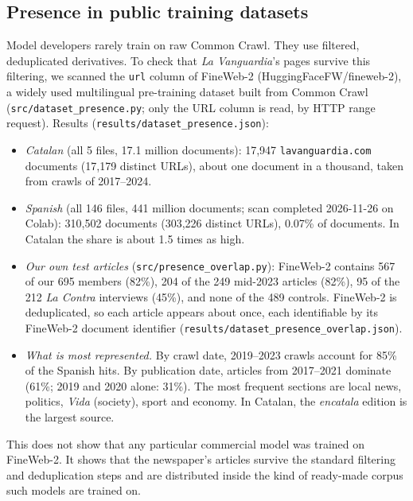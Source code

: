 \documentclass[10pt,a4paper]{article}
\begin{document}
\subsection{Presence in public training datasets}\label{sec:presence}
Model developers rarely train on raw Common Crawl. They use filtered, deduplicated derivatives. To check that
\emph{La Vanguardia}'s pages survive this filtering, we scanned the \texttt{url} column of FineWeb-2
(HuggingFaceFW/fineweb-2), a widely used multilingual pre-training dataset built from Common Crawl
(\texttt{src/dataset\_presence.py}; only the URL column is read, by HTTP range request). Results
(\texttt{results/dataset\_presence.json}):
\begin{itemize}
\item \emph{Catalan} (all 5 files, 17.1 million documents): 17,947 \texttt{lavanguardia.com} documents (17,179 distinct
URLs), about one document in a thousand, taken from crawls of 2017--2024.
\item \emph{Spanish} (all 146 files, 441 million documents; scan completed 2026-11-26 on Colab): 310,502
documents (303,226 distinct URLs), 0.07\% of documents. In Catalan the share is about 1.5 times as high.
\item \emph{Our own test articles} (\texttt{src/presence\_overlap.py}): FineWeb-2 contains 567 of our 695 members
(82\%), 204 of the 249 mid-2023 articles (82\%), 95 of the 212 \emph{La Contra} interviews (45\%), and none of the
489 controls. FineWeb-2 is deduplicated, so each article appears about once, each identifiable by its FineWeb-2
document identifier (\texttt{results/dataset\_presence\_overlap.json}).
\item \emph{What is most represented.} By crawl date, 2019--2023 crawls account for 85\% of the Spanish hits. By
publication date, articles from 2017--2021 dominate (61\%; 2019 and 2020 alone: 31\%). The most frequent sections are
local news, politics, \emph{Vida} (society), sport and economy. In Catalan, the \emph{encatala} edition is the largest source.
\end{itemize}
This does not show that any particular commercial model was trained on FineWeb-2. It shows that the newspaper's
articles survive the standard filtering and deduplication steps and are distributed inside the kind of ready-made
corpus such models are trained on.
\end{document}
